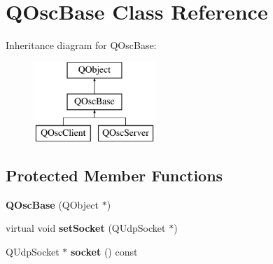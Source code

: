 \hypertarget{class_q_osc_base}{}\section{Q\+Osc\+Base Class Reference}
\label{class_q_osc_base}
Inheritance diagram for Q\+Osc\+Base\+:\begin{figure}[H]
\begin{center}
\leavevmode
\includegraphics[height=3.000000cm]{class_q_osc_base}
\end{center}
\end{figure}
\subsection*{Protected Member Functions}
\begin{DoxyCompactItemize}
\item 
\mbox{\label{class_q_osc_base_ad76ec5b29dc8fe5c034479df2faa738b}} 
{\bfseries Q\+Osc\+Base} (Q\+Object $\ast$)
\item 
\mbox{\label{class_q_osc_base_a7fde475377665f8a0edbeb85e6897cc9}} 
virtual void {\bfseries set\+Socket} (Q\+Udp\+Socket $\ast$)
\item 
\mbox{\label{class_q_osc_base_ad17489860e0aab380c33510845d7cf32}} 
Q\+Udp\+Socket $\ast$ {\bfseries socket} () const
\end{DoxyCompactItemize}
